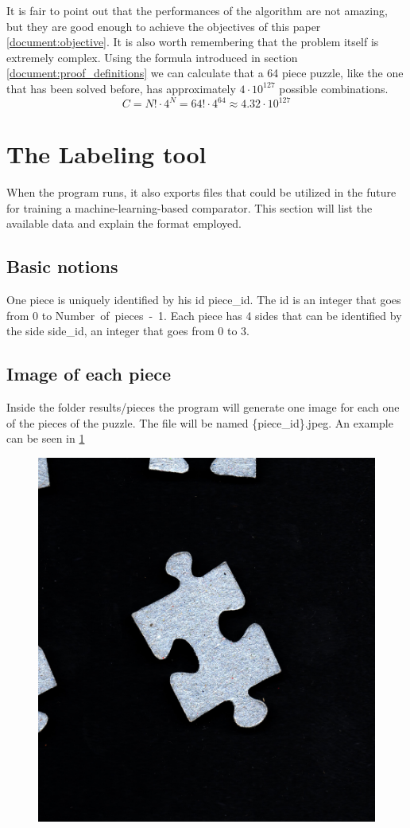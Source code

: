 \documentclass{article}
\begin{document}
It is fair to point out that the performances of the algorithm are not amazing,
but they are good enough to achieve the objectives of this paper \ref{document:objective}.
It is also worth remembering that the problem itself is extremely complex.
Using the formula introduced in section \ref{document:proof_definitions} we can calculate that a 64 piece puzzle,
like the one that has been solved before, has approximately \(4 \cdot 10^{127}\) possible combinations.
\[C = N! \cdot 4^N =  64! \cdot 4^{64} \approx 4.32 \cdot 10^{127}\]


\section{The Labeling tool}
When the program runs, it also exports files that could be utilized
in the future for training a machine-learning-based comparator.
This section will list the available data and explain the format employed.

\subsection{Basic notions}

One piece is uniquely identified by his id piece\_id.
The id is an integer that goes from 0 to \mbox{Number of pieces - 1}.
Each piece has 4 sides that can be identified by the side side\_id,
an integer that goes from 0 to 3.

\subsection{Image of each piece}

Inside the folder results/pieces the program will generate one image
for each one of the pieces of the puzzle. The file will be named \{piece\_id\}.jpeg.
An example can be seen in \ref{fig:result_pieces}

\begin{figure}[H]
  \caption{}\label{fig:result_pieces}
  \centering
  \includegraphics[height=0.3\textwidth]{pictures/result_pieces.jpeg}
\end{figure}
\end{document}
